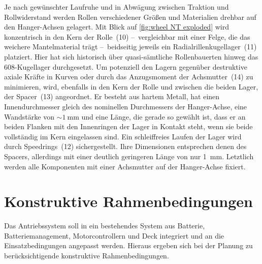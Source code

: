 		Je nach gewünschter Laufruhe und in Abwägung zwischen Traktion und Rollwiderstand werden Rollen verschiedener Größen und Materialien drehbar auf den Hanger-Achsen gelagert.
		Mit Blick auf \cref{fig:wheel NT exploded} wird konzentrisch in den Kern der Rolle~(10) --~vergleichbar mit einer Felge, die das weichere Mantelmaterial trägt --~beidseitig jeweils ein Radialrillenkugellager~(11) platziert.
		Hier hat sich historisch über quasi-sämtliche Rollenbauerten hinweg das 608-Kugellager durchgesetzt.
		Um potenziell den Lagern gegenüber destruktive axiale Kräfte in Kurven oder durch das Anzugsmoment der Achsmutter~(14) zu minimieren, wird, ebenfalls in den Kern der Rolle und zwischen die beiden Lager, der Spacer~(13) angeordnet.
		Er besteht aus hartem Metall, hat einen Innendurchmesser gleich des nominellen Durchmessers der Hanger-Achse, eine Wandstärke von \(\sim \qty{1}{\milli\metre}\) und eine Länge, die gerade so gewählt ist, dass er an beiden Flanken mit den Innenringen der Lager in Kontakt steht, wenn sie beide vollständig im Kern eingelassen sind.
		Ein schleiffreies Laufen der Lager wird durch Speedrings~(12) sichergestellt.
		Ihre Dimensionen entsprechen denen des Spacers, allerdings mit einer deutlich geringeren Länge von nur \qty{1}{\milli\metre}.
		Letztlich werden alle Komponenten mit einer Achsmutter auf der Hanger-Achse fixiert.
	\section{Konstruktive Rahmenbedingungen}\label{sec:constructive limitations}
		Das Antriebssystem soll in ein bestehendes System aus Batterie, Batteriemanagement, Motorcontrollern und Deck integriert und an die Einsatzbedingungen angepasst werden.
		Hieraus ergeben sich bei der Planung zu berücksichtigende konstruktive Rahmenbedingungen.
